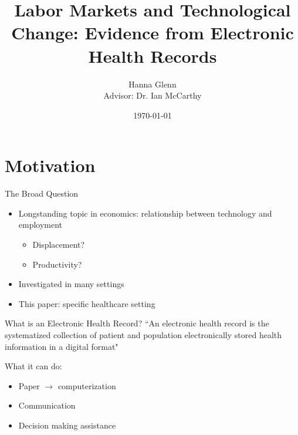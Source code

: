 \documentclass[10pt]{beamer}
\title{Labor Markets and Technological Change: Evidence from Electronic Health Records}
\subtitle{Hanna Glenn\\ \small Advisor: Dr. Ian McCarthy}
\date{\today}
\begin{document}
\maketitle




\section[Motivation]{Motivation}

\begin{frame}{The Broad Question}
\begin{itemize}
    \item Longstanding topic in economics: relationship between technology and employment
    \vspace{2mm}
    \begin{itemize}
        \item Displacement?
        \item Productivity?
    \end{itemize}
    \vspace{3mm}
    \item Investigated in many settings
    \vspace{3mm}
    \item This paper: specific healthcare setting
\end{itemize}

\end{frame}

\begin{frame}[fragile]{What is an Electronic Health Record?}
``An electronic health record is the systematized collection of patient and population electronically stored health information in a digital format"

\vspace{3mm}

What it can do:
\begin{itemize}
    \item Paper $\rightarrow$ computerization
    \item Communication
    \item Decision making assistance
\end{itemize}

\end{frame}
\end{document}
